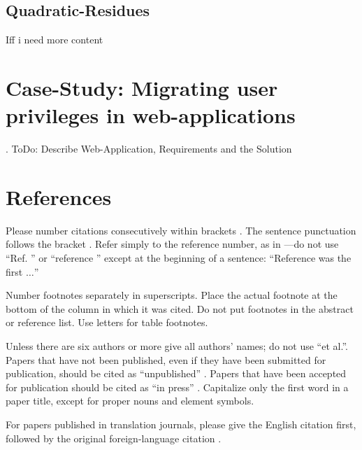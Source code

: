 \documentclass[conference]{IEEEtran}
\begin{document}
\subsection{Quadratic-Residues}
Iff i need more content

\section{Case-Study: Migrating user privileges in web-applications}
\label{sec:casestudy}.
ToDo: Describe Web-Application, Requirements and the Solution

\section*{References}

Please number citations consecutively within brackets \cite{b1}. The 
sentence punctuation follows the bracket \cite{b2}. Refer simply to the reference 
number, as in \cite{b3}---do not use ``Ref. \cite{b3}'' or ``reference \cite{b3}'' except at 
the beginning of a sentence: ``Reference \cite{b3} was the first $\ldots$''

Number footnotes separately in superscripts. Place the actual footnote at 
the bottom of the column in which it was cited. Do not put footnotes in the 
abstract or reference list. Use letters for table footnotes.

Unless there are six authors or more give all authors' names; do not use 
``et al.''. Papers that have not been published, even if they have been 
submitted for publication, should be cited as ``unpublished'' \cite{b4}. Papers 
that have been accepted for publication should be cited as ``in press'' \cite{b5}. 
Capitalize only the first word in a paper title, except for proper nouns and 
element symbols.

For papers published in translation journals, please give the English 
citation first, followed by the original foreign-language citation \cite{b6}.
\end{document}
